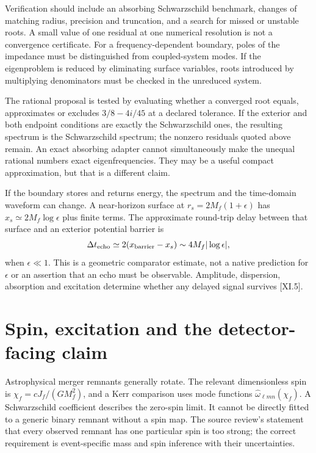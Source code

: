 Verification should include an absorbing Schwarzschild benchmark, changes of matching radius, precision and truncation, and a search for missed or unstable roots. A small value of one residual at one numerical resolution is not a convergence certificate. For a frequency-dependent boundary, poles of the impedance must be distinguished from coupled-system modes. If the eigenproblem is reduced by eliminating surface variables, roots introduced by multiplying denominators must be checked in the unreduced system.

The rational proposal is tested by evaluating whether a converged root equals, approximates or excludes $3/8-4i/45$ at a declared tolerance. If the exterior and both endpoint conditions are exactly the Schwarzschild ones, the resulting spectrum is the Schwarzschild spectrum; the nonzero residuals quoted above remain. An exact absorbing adapter cannot simultaneously make the unequal rational numbers exact eigenfrequencies. They may be a useful compact approximation, but that is a different claim.

If the boundary stores and returns energy, the spectrum and the time-domain waveform can change. A near-horizon surface at $r_s=2M_f(1+\epsilon)$ has $x_s\simeq2M_f\log\epsilon$ plus finite terms. The approximate round-trip delay between that surface and an exterior potential barrier is
\begin{equation}
 \Delta t_{\rm echo}\simeq2(x_{\rm barrier}-x_s)
             \sim4M_f|\log\epsilon|,
 \label{c11:echo}
\end{equation}
when $\epsilon\ll1$. This is a geometric comparator estimate, not a native prediction for $\epsilon$ or an assertion that an echo must be observable. Amplitude, dispersion, absorption and excitation determine whether any delayed signal survives [XI.5].

\section{Spin, excitation and the detector-facing claim}
Astrophysical merger remnants generally rotate. The relevant dimensionless spin is $\chi_f=cJ_f/(GM_f^2)$, and a Kerr comparison uses mode functions $\widehat\omega_{\ell mn}(\chi_f)$. A Schwarzschild coefficient describes the zero-spin limit. It cannot be directly fitted to a generic binary remnant without a spin map. The source review's statement that every observed remnant has one particular spin is too strong; the correct requirement is event-specific mass and spin inference with their uncertainties.

